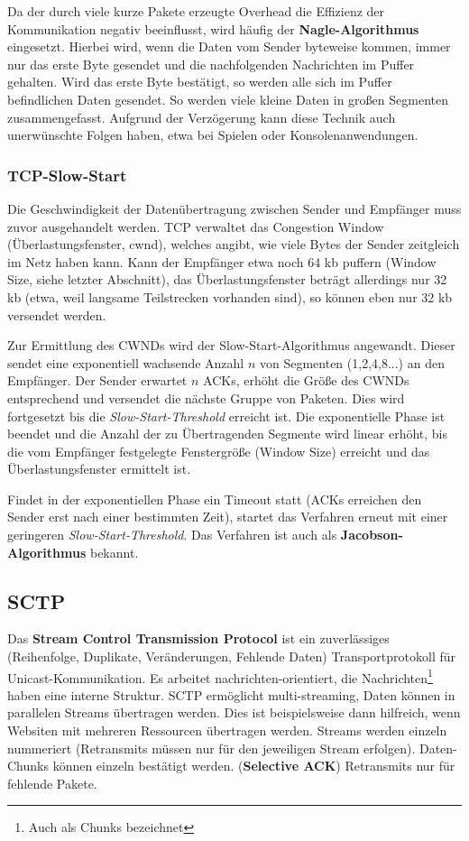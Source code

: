 \documentclass{article} %
\begin{document}
Da der durch viele kurze Pakete erzeugte Overhead die Effizienz der Kommunikation negativ beeinflusst, wird häufig der \textbf{Nagle-Algorithmus} eingesetzt.
Hierbei wird, wenn die Daten vom Sender byteweise kommen, immer nur das erste Byte gesendet und die nachfolgenden Nachrichten im Puffer gehalten.
Wird das erste Byte bestätigt, so werden alle sich im Puffer befindlichen Daten gesendet.
So werden viele kleine Daten in großen Segmenten zusammengefasst.
Aufgrund der Verzögerung kann diese Technik auch unerwünschte Folgen haben, etwa bei Spielen oder Konsolenanwendungen.

\subsubsection{TCP-Slow-Start}
Die Geschwindigkeit der Datenübertragung zwischen Sender und Empfänger muss zuvor ausgehandelt werden.
TCP verwaltet das Congestion Window (Überlastungsfenster, cwnd), welches angibt, wie viele Bytes der Sender zeitgleich im Netz haben kann.
Kann der Empfänger etwa noch 64 kb puffern (Window Size, siehe letzter Abschnitt), das Überlastungsfenster beträgt allerdings nur 32 kb (etwa, weil langsame Teilstrecken vorhanden sind), so können eben nur 32 kb versendet werden.

Zur Ermittlung des CWNDs wird der Slow-Start-Algorithmus angewandt.
Dieser sendet eine exponentiell wachsende Anzahl $n$ von Segmenten (1,2,4,8...) an den Empfänger.
Der Sender erwartet $n$ ACKs, erhöht die Größe des CWNDs entsprechend und versendet die nächste Gruppe von Paketen.
Dies wird fortgesetzt bis die \emph{Slow-Start-Threshold} erreicht ist.
Die exponentielle Phase ist beendet und die Anzahl der zu Übertragenden Segmente wird linear erhöht, bis die vom Empfänger festgelegte Fenstergröße (Window Size) erreicht und das Überlastungsfenster ermittelt ist.

Findet in der exponentiellen Phase ein Timeout statt (ACKs erreichen den Sender erst nach einer bestimmten Zeit), startet das Verfahren erneut mit einer geringeren \emph{Slow-Start-Threshold}.
Das Verfahren ist auch als \textbf{Jacobson-Algorithmus} bekannt.

\subsection{SCTP}
Das \textbf{Stream Control Transmission Protocol}\cite{rfc4960} ist ein zuverlässiges (Reihenfolge, Duplikate, Veränderungen, Fehlende Daten) Transportprotokoll für Unicast-Kommunikation.
Es arbeitet nachrichten-orientiert, die Nachrichten\footnote{Auch als Chunks bezeichnet} haben eine interne Struktur.
SCTP ermöglicht multi-streaming, Daten können in parallelen Streams übertragen werden.
Dies ist beispielsweise dann hilfreich, wenn Websiten mit mehreren Ressourcen übertragen werden.
Streams werden einzeln nummeriert (Retransmits müssen nur für den jeweiligen Stream erfolgen).
Daten-Chunks können einzeln bestätigt werden. (\textbf{Selective ACK})
Retransmits nur für fehlende Pakete.
\end{document}
